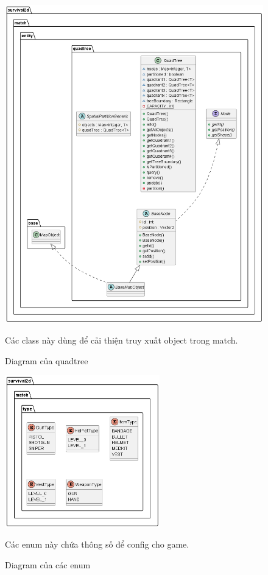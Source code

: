 \documentclass[12pt,a4paper]{article}
\begin{document}
  \begin{figure}[H]
    \centering
    \includegraphics[width=\textwidth,height=0.9\textheight,keepaspectratio]{Img/uml/quadtree.png}
    \caption{Diagram của quadtree}
    Các class này dùng để cải thiện truy xuất object trong match.
  \end{figure}

  \begin{figure}[H]
    \centering
    \includegraphics[width=0.6\textwidth]{Img/uml/type.png}
    \caption{Diagram của các enum}
    Các enum này chứa thông số để config cho game.
  \end{figure}
\end{document}
